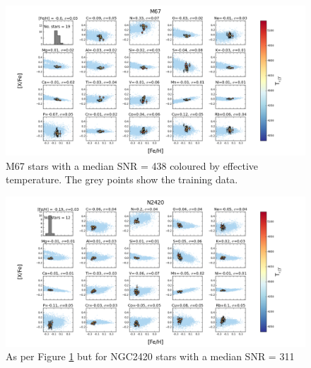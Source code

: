 \documentclass[14pt, preprint2]{aastex6}
\begin{document}
\begin{figure}
\centering
               \includegraphics[scale=0.5]{20elem7_tc2_nofilt.png}
  \caption{ M67 stars with a median SNR = 438  coloured by effective temperature. The grey points show the training data. }
\label{fig:c1}
\end{figure} %

\begin{figure}
\centering
  \includegraphics[scale=0.5]{20elem12_tc2_nofilt.png}  
  \caption{ As per Figure \ref{fig:c1} but for NGC2420 stars with  a median SNR = 311 } %
\label{fig:c2}
\end{figure}
\end{document}
